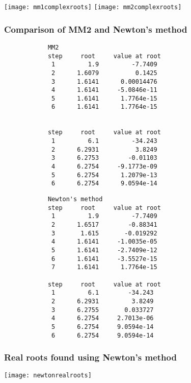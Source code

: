 \documentclass{article}
\begin{document}
	\texttt{[image: mm1complexroots]}
	\texttt{[image: mm2complexroots]}
	
	\newpage
	\subsubsection{Comparison of MM2 and Newton's method}
	
		\begin{multicols}{2}
		\begin{verbatim}
			MM2
			step     root     value at root
			 1         1.9         -7.7409 
			 2      1.6079          0.1425 
			 3      1.6141      0.00014476 
			 4      1.6141     -5.0846e-11 
			 5      1.6141      1.7764e-15 
			 6      1.6141      1.7764e-15 
			 
			 
			step     root     value at root
			 1         6.1         -34.243 
			 2      6.2931          3.8249 
			 3      6.2753        -0.01103 
			 4      6.2754     -9.1773e-09 
			 5      6.2754      1.2079e-13 
			 6      6.2754      9.0594e-14 
		\end{verbatim}
		\begin{verbatim}
			Newton's method
			step     root     value at root
			 1         1.9         -7.7409 
			 2      1.6517        -0.88341 
			 3       1.615       -0.019292 
			 4      1.6141     -1.0035e-05 
			 5      1.6141     -2.7409e-12 
			 6      1.6141     -3.5527e-15 
			 7      1.6141      1.7764e-15 
			 
			step     root     value at root
			 1         6.1        -34.243  
			 2      6.2931         3.8249  
			 3      6.2755       0.033727  
			 4      6.2754     2.7013e-06  
			 5      6.2754     9.0594e-14  
			 6      6.2754     9.0594e-14  
		\end{verbatim}
	\end{multicols}
	
	\subsubsection{Real roots found using Newton's method}
	
	\texttt{[image: newtonrealroots]}
	
\end{document}
